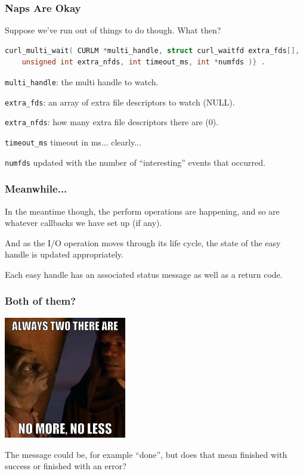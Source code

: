 \begin{frame}[fragile]
\frametitle{Naps Are Okay}

Suppose we've run out of things to do though. What then? 

\begin{lstlisting}[language=C]
curl_multi_wait( CURLM *multi_handle, struct curl_waitfd extra_fds[], 
    unsigned int extra_nfds, int timeout_ms, int *numfds )} . 
\end{lstlisting}
 
\texttt{multi\_handle}: the multi handle to watch.

\texttt{extra\_fds}: an array of extra file descriptors to watch (NULL).

\texttt{extra\_nfds}: how many extra file descriptors there are (0).

\texttt{timeout\_ms} timeout in ms... clearly...

\texttt{numfds} updated with the number of ``interesting'' events that occurred.
 
\end{frame}

\begin{frame}
\frametitle{Meanwhile...}

In the meantime though, the perform operations are happening, and so are whatever callbacks we have set up (if any). 

And as the I/O operation moves through its life cycle, the state of the easy handle is updated appropriately. 

Each easy handle has an associated status message as well as a return code.


\end{frame}


\begin{frame}
\frametitle{Both of them?}
\begin{center}
	\includegraphics[width=0.4\textwidth]{images/yoda-two.jpg}
\end{center}

The message could be, for example ``done'', but does that mean finished with success or finished with an error? 
\end{frame}

